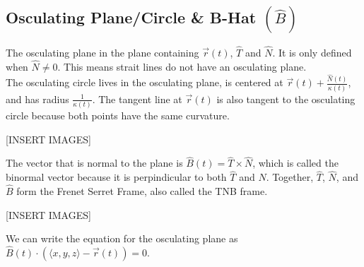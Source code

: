 \subsection{Osculating Plane/Circle \& B-Hat $\left(\hat{B}\right)$}
\noindent
The osculating plane in the plane containing $\vec{r}(t)$, $\hat{T}$ and $\hat{N}$. It is only defined when $\hat{N}\neq 0$. This means strait lines do not have an osculating plane.\\

\noindent
The osculating circle lives in the osculating plane, is centered at $\vec{r}(t)+\frac{\hat{N}(t)}{\kappa(t)}$, and has radius $\frac{1}{\kappa(t)}$. The tangent line at $\vec{r}(t)$ is also tangent to the osculating circle because both points have the same curvature.

[INSERT IMAGES]

\noindent
The vector that is normal to the plane is $\hat{B}(t)=\hat{T}\times\hat{N}$, which is called the binormal vector because it is perpindicular to both $\hat{T}$ and $\hat{N}$. Together, $\hat{T}$, $\hat{N}$, and $\hat{B}$ form the Frenet Serret Frame, also called the TNB frame.

[INSERT IMAGES]

\noindent
We can write the equation for the osculating plane as $\hat{B}(t)\cdot\left(\langle x,y,z\rangle - \vec{r}(t)\right) =0$.